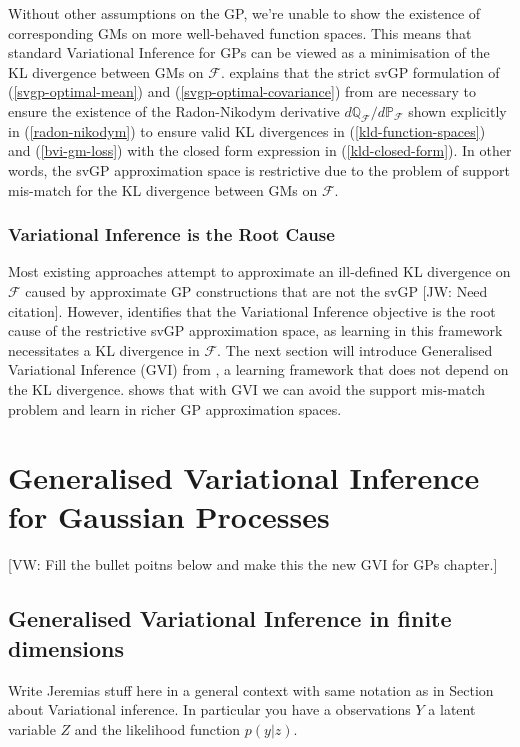 \documentclass{article}
\newcommand{\jw}[1]{{\color{gray} [JW: #1]}}
\newcommand{\vw}[1]{{\color{green} [VW: #1]}}
\numberwithin{equation}{section}
\begin{document}
Without other assumptions on the GP, we're unable to show the existence of corresponding GMs on more well-behaved function spaces. This means that standard Variational Inference for GPs can be viewed as a minimisation of the KL divergence between GMs on $\mathcal{F}$. \cite{matthews2017scalable} explains that the strict svGP formulation of (\ref{svgp-optimal-mean}) and (\ref{svgp-optimal-covariance}) from \cite{titsias2009variational} are necessary to ensure the existence of the Radon-Nikodym derivative $d \mathbb{Q}_\mathcal{F}/d \mathbb{P}_\mathcal{F}$ shown explicitly in (\ref{radon-nikodym}) to ensure valid KL divergences in (\ref{kld-function-spaces}) and (\ref{bvi-gm-loss}) with the closed form expression in (\ref{kld-closed-form}). In other words, the svGP approximation space is restrictive due to the problem of support mis-match for the KL divergence between GMs on $\mathcal{F}$.

\subsubsection{Variational Inference is the Root Cause}
Most existing approaches attempt to approximate an ill-defined KL divergence on $\mathcal{F}$ caused by approximate GP constructions that are not the svGP \jw{Need citation}. However, \cite{wild2022generalized} identifies that the Variational Inference objective is the root cause of the restrictive svGP approximation space, as learning in this framework necessitates a KL divergence in $\mathcal{F}$. The next section will introduce Generalised Variational Inference (GVI) from \cite{knoblauch2022optimization}, a learning framework that does not depend on the KL divergence. \cite{wild2022generalized} shows that with GVI we can avoid the support mis-match problem and learn in richer GP approximation spaces.

\newpage


\section{Generalised Variational Inference for Gaussian Processes}
\vw{Fill the bullet poitns below and make this the new GVI for GPs chapter.}

\subsection{Generalised Variational Inference in finite dimensions}

Write Jeremias stuff here in a general context with same notation as in Section about Variational inference. In particular you have a observations $Y$ a latent variable $Z$ and the likelihood function $p(y|z)$. 
\end{document}
